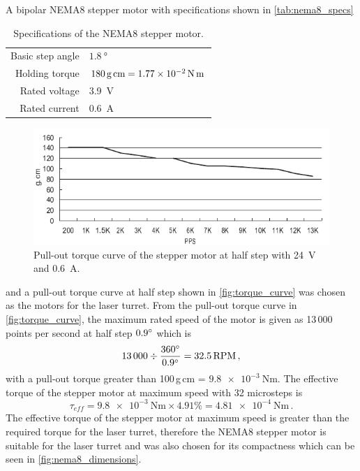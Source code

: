 A bipolar NEMA8 stepper motor with specifications shown in \autoref{tab:nema8_specs}
\begin{table}[h]
  \centering
  \begin{tabular}{rl}
    \hline
    Basic step angle & $\SI{1.8}{\degree}$                               \\
    Holding torque   & $180\,\text{g\,cm} = \SI{1.77e-2}{\newton\meter}$ \\
    Rated voltage    & 3.9~V                                             \\
    Rated current    & 0.6~A                                             \\
    \hline
  \end{tabular}
  \caption{Specifications of the NEMA8 stepper motor.}
  \label{tab:nema8_specs}
\end{table}
\begin{figure}[h]
  \centering
  \includegraphics[width=\textwidth]{figures/hardware_design/torque_curve.pdf}
  \caption{Pull-out torque curve of the stepper motor at half step with 24~V and 0.6~A.}
  \label{fig:torque_curve}
\end{figure}
and a pull-out torque curve at half step shown in \autoref{fig:torque_curve} was chosen as the motors for the laser turret. From the pull-out torque curve in \autoref{fig:torque_curve}, the maximum rated speed of the motor is given as 13\,000 points per second at half step $0.9^{\circ}$ which is
\begin{equation}
  \num{13000} \div \frac{360^{\circ}}{0.9^{\circ}} = 32.5\,\text{RPM}\,,
\end{equation}
with a pull-out torque greater than 100\,g\,cm = $\SI{9.8e-3}{\newton\meter}
$. The effective torque of the stepper motor at maximum speed with 32 microsteps is
\begin{equation}
  \tau_{eff} = \SI{9.8e-3}{\newton\meter} \times 4.91\% = \SI{4.81e-4}{\newton\meter}\,.
\end{equation}
The effective torque of the stepper motor at maximum speed is greater than the required torque for the laser turret, therefore the NEMA8 stepper motor is suitable for the laser turret and was also chosen for its compactness which can be seen in \autoref{fig:nema8_dimensions}.

